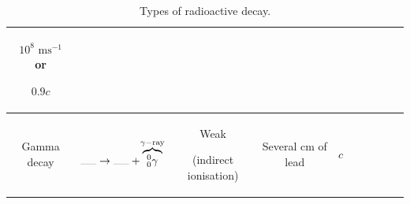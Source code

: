 \documentclass[oneside]{book}
\begin{document}
\begin{itemize}
\begin{table}[H]
\begin{tabular}{ScScScScSc}
\begin{minipage}{3cm-23pt}
                \(10^8\text{ ms}^{-1}\) or 
                
                \(0.9c\)
            \end{minipage}\\
            \midrule
            Gamma decay & 
            \begin{minipage}{3cm}
                \vspace{-4.07mm}
                \[\rule{0.5cm}{0.05mm}\to \rule{0.5cm}{0.05mm}+\overbrace{_0^0\gamma}^{
                    \mathclap{\gamma-\text{ray}}}\]
            \end{minipage}& 
            \begin{minipage}{2cm}
                \centering
                Weak

                (indirect ionisation)
            \end{minipage}&
            \begin{minipage}{2cm}
                \centering
                Several cm of lead
            \end{minipage}& \(c\)\\
            \bottomrule
        \end{tabular}
        \caption{Types of radioactive decay.}
        \label{table:types-of-radioactive-decay}
    \end{table}


\end{itemize}
\end{document}
